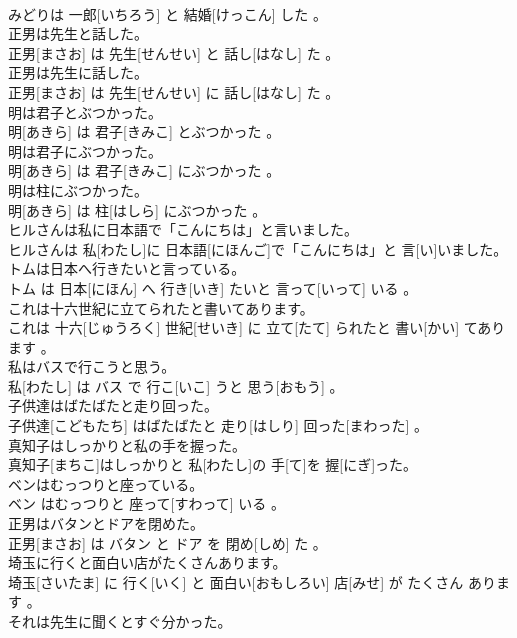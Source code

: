 \documentclass[8pt]{extreport}
\begin{document}
\begin{CJK}{UTF8}{min}
\\	みどりは 一郎[いちろう] と 結婚[けっこん] した 。
\\	正男は先生と話した。	
\\	正男[まさお] は 先生[せんせい] と 話し[はなし] た 。
\\	正男は先生に話した。	
\\	正男[まさお] は 先生[せんせい] に 話し[はなし] た 。
\\	明は君子とぶつかった。	
\\	明[あきら] は 君子[きみこ] とぶつかった 。
\\	明は君子にぶつかった。	
\\	明[あきら] は 君子[きみこ] にぶつかった 。
\\	明は柱にぶつかった。	
\\	明[あきら] は 柱[はしら] にぶつかった 。
\\	ヒルさんは私に日本語で「こんにちは」と言いました。	
\\	ヒルさんは 私[わたし]に 日本語[にほんご]で「こんにちは」と 言[い]いました。
\\	トムは日本へ行きたいと言っている。	
\\	トム は 日本[にほん] へ 行き[いき] たいと 言って[いって] いる 。
\\	これは十六世紀に立てられたと書いてあります。	
\\	これは 十六[じゅうろく] 世紀[せいき] に 立て[たて] られたと 書い[かい] てあります 。
\\	私はバスで行こうと思う。	
\\	私[わたし] は バス で 行こ[いこ] うと 思う[おもう] 。
\\	子供達はばたばたと走り回った。	
\\	子供達[こどもたち] はばたばたと 走り[はしり] 回った[まわった] 。
\\	真知子はしっかりと私の手を握った。	
\\	真知子[まちこ]はしっかりと 私[わたし]の 手[て]を 握[にぎ]った。
\\	ベンはむっつりと座っている。	
\\	ベン はむっつりと 座って[すわって] いる 。
\\	正男はバタンとドアを閉めた。	
\\	正男[まさお] は バタン と ドア を 閉め[しめ] た 。
\\	埼玉に行くと面白い店がたくさんあります。	
\\	埼玉[さいたま] に 行く[いく] と 面白い[おもしろい] 店[みせ] が たくさん あります 。
\\	それは先生に聞くとすぐ分かった。	

\end{CJK}
\end{document}
